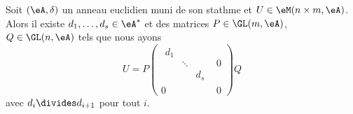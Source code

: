 \begin{proposition}   \label{PropPDfCqee}
	Soit \( (\eA,\delta)\) un anneau euclidien muni de son stathme  et \( U\in \eM(n \times m,\eA)\). Alors il existe \( d_1,\ldots, d_s\in \eA^*\) et des matrices \( P\in\GL(m,\eA)\), \( Q\in \GL(n,\eA)\) tels que nous ayons
	\begin{equation}
		U=P \begin{pmatrix}
			\begin{matrix}
				d_1 &        &     \\
				    & \ddots &     \\
				    &        & d_s
			\end{matrix} & 0        \\
			0                     & 0
		\end{pmatrix}Q
	\end{equation}
	avec \( d_i\divides d_{i+1}\) pour tout \( i\).
\end{proposition}

